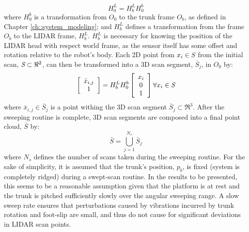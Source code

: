 				\begin{equation}
					H^{L}_{0} = H^{L}_{b} H^{b}_{0}
					\label{eq::world_to_sensor}
				\end{equation}
			where $H^{b}_{0}$ is a transformation from $O_{0}$ to the trunk frame $O_{b}$, as defined in Chapter \ref{ch::system_modeling}; and $H^{L}_{b}$ defines a transformation from the frame $O_{b}$ to the LIDAR frame, $H^{L}_{b}$. $H^{L}_{b}$ is necessary for knowing the position of the LIDAR head with respect world frame, as the sensor itself has some offset and rotation relative to the robot's body. Each 2D point from $x_{i} \in \emph{S}$ from the initial scan, $\emph{S}\subset \Re^{2}$, can then be transformed into a 3D scan segment, $\bar{S}_{j}$, in $O_{0}$ by:
				\begin{equation}
					\left[
						\begin{array}{c}
							\bar{x}_{i,j} \\ 1
						\end{array}
					\right]
				 = H^{L}_{b} H^{b}_{0}	
					\left[
						\begin{array}{c}
							x_{i} \\ 0 \\ 1
						\end{array}
					\right] \forall x_{i} \in \emph{S}
					\label{eq::scan_to_segment}
				\end{equation}
			where $\bar{x}_{i,j} \in \bar{S}_{j}$ is a point withing the 3D \Jth scan segment $\bar{S}_{j} \subset \Re^{3}$. After the sweeping routine is complete, 3D scan segments are composed into a final point cloud, $\bar{S}$ by:
			\begin{equation}
				\bar{S} = \bigcup_{j=1}^{N_{s}} \bar{S}_{j}
			\end{equation}
			where $N_{s}$ defines the number of scans taken during the sweeping routine. For the sake of simplicity, it is assumed that the trunk's position, $p_{b}$, is fixed (system is completely ridged) during a swept-scan routine. In the results to be presented, this seems to be a reasonable assumption given that the platform is at rest and the trunk is pitched sufficiently slowly over the angular sweeping range. A slow sweep rate ensures that perturbations caused by vibrations incurred by trunk rotation and foot-slip are small, and thus do not cause for significant deviations in LIDAR scan points.
